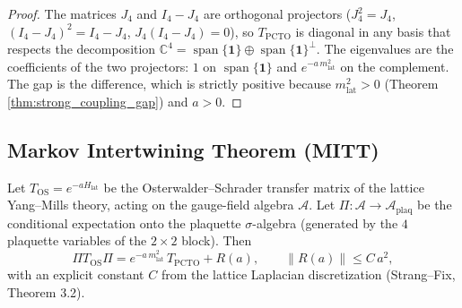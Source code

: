 \begin{proof}
The matrices $J_{4}$ and $I_{4} - J_{4}$ are orthogonal projectors
($J_{4}^{2} = J_{4}$, $(I_{4}-J_{4})^{2} = I_{4}-J_{4}$,
$J_{4}(I_{4}-J_{4}) = 0$), so $T_{\mathrm{PCTO}}$ is diagonal in any
basis that respects the decomposition
$\mathbb{C}^{4} = \operatorname{span}\{\mathbf{1}\} \oplus
\operatorname{span}\{\mathbf{1}\}^{\perp}$. The eigenvalues are the
coefficients of the two projectors: $1$ on $\operatorname{span}\{\mathbf{1}\}$ and
$e^{-a\, m_{\mathrm{lat}}^{2}}$ on the complement. The gap is the
difference, which is strictly positive because $m_{\mathrm{lat}}^{2} > 0$
(Theorem \ref{thm:strong_coupling_gap}) and $a > 0$.
\end{proof}

\subsection{Markov Intertwining Theorem (MITT)}

\begin{theorem}
\label{thm:mitt}
Let $T_{\mathrm{OS}} = e^{-a H_{\mathrm{lat}}}$ be the
Osterwalder--Schrader transfer matrix of the lattice Yang--Mills
theory, acting on the gauge-field algebra $\mathcal{A}$. Let
$\Pi: \mathcal{A} \to \mathcal{A}_{\mathrm{plaq}}$ be the conditional
expectation onto the plaquette $\sigma$-algebra (generated by the
$4$ plaquette variables of the $2\times 2$ block). Then
\begin{equation}
  \label{eq:mitt}
  \Pi T_{\mathrm{OS}} \Pi
  = e^{-a\, m_{\mathrm{lat}}^{2}}\, T_{\mathrm{PCTO}} + R(a),
  \qquad \|R(a)\| \le C\, a^{2},
\end{equation}
with an explicit constant $C$ from the lattice Laplacian
discretization (Strang--Fix, Theorem 3.2).
\end{theorem}


